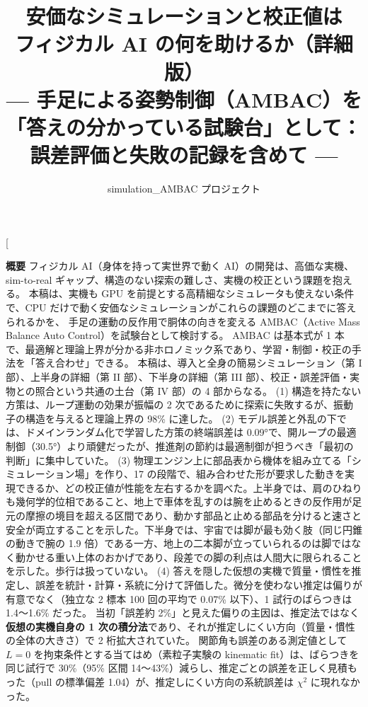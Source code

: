 \documentclass[paper=a4paper,fontsize=10pt,twocolumn,column_gap=2zw,line_length=24zw,number_of_lines=46,head_space=20mm]{jlreq}
\title{\textbf{安価なシミュレーションと校正値は\\フィジカル AI の何を助けるか（詳細版）}\\[0.3em]
\large --- 手足による姿勢制御（AMBAC）を「答えの分かっている試験台」として：\\誤差評価と失敗の記録を含めて ---}
\author{simulation\_AMBAC プロジェクト}
\date{\fpversion}
\begin{document}
\twocolumn[
\begin{@twocolumnfalse}
\maketitle
\vspace{-1.5em}
\begin{center}\begin{minipage}{0.9\textwidth}\small
\textbf{概要}\quad
フィジカル AI（身体を持って実世界で動く AI）の開発は、高価な実機、sim-to-real ギャップ、構造のない探索の難しさ、実機の校正という課題を抱える。
本稿は、実機も GPU を前提とする高精細なシミュレータも使えない条件で、CPU だけで動く安価なシミュレーションがこれらの課題のどこまでに答えられるかを、
手足の運動の反作用で胴体の向きを変える AMBAC（Active Mass Balance Auto Control）を試験台として検討する。
AMBAC は基本式が 1 本で、最適解と理論上界が分かる非ホロノミック系であり、学習・制御・校正の手法を「答え合わせ」できる。
本稿は、導入と全身の簡易シミュレーション（第 I 部）、上半身の詳細（第 II 部）、下半身の詳細（第 III 部）、校正・誤差評価・実物との照合という共通の土台（第 IV 部）の 4 部からなる。
(1) 構造を持たない方策は、ループ運動の効果が振幅の 2 次であるために探索に失敗するが、振動子の構造を与えると理論上界の 98\% に達した。
(2) モデル誤差と外乱の下では、ドメインランダム化で学習した方策の終端誤差は 0.09°で、開ループの最適制御（30.5°）より頑健だったが、推進剤の節約は最適制御が担うべき「最初の判断」に集中していた。
(3) 物理エンジン上に部品表から機体を組み立てる「シミュレーション場」を作り、17 の段階で、組み合わせた形が要求した動きを実現できるか、どの校正値が性能を左右するかを調べた。上半身では、肩のひねりも幾何学的位相であること、地上で車体を乱すのは腕を止めるときの反作用が足元の摩擦の境目を超える区間であり、動かす部品と止める部品を分けると速さと安全が両立することを示した。下半身では、宇宙では脚が最も効く肢（同じ円錐の動きで腕の 1.9 倍）である一方、地上の二本脚が立っていられるのは脚ではなく動かせる重い上体のおかげであり、段差での脚の利点は人間大に限られることを示した。歩行は扱っていない。
(4) 答えを隠した仮想の実機で質量・慣性を推定し、誤差を統計・計算・系統に分けて評価した。微分を使わない推定は偏りが有意でなく（独立な 2 標本 100 回の平均で 0.07\% 以下）、1 試行のばらつきは 1.4〜1.6\% だった。
当初「誤差約 2\%」と見えた偏りの主因は、推定法ではなく\textbf{仮想の実機自身の 1 次の積分法}であり、それが推定しにくい方向（質量・慣性の全体の大きさ）で 2 桁拡大されていた。
関節角も誤差のある測定値として $L=0$ を拘束条件とする当てはめ（素粒子実験の kinematic fit）は、ばらつきを同じ試行で 30\%（95\% 区間 14〜43\%）減らし、推定ごとの誤差を正しく見積もった（pull の標準偏差 1.04）が、推定しにくい方向の系統誤差は $\chi^2$ に現れなかった。

\end{minipage}
\end{center}
\end{@twocolumnfalse}
\end{document}
